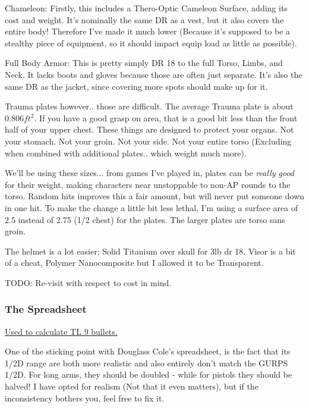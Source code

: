 \begin{multicols*}{2}
	Chameleon: Firstly, this includes a Thero-Optic Cameleon Surface, adding its cost and weight. It's nominally the same DR as a vest, but it also covers the entire body! Therefore I've made it much lower (Because it's supposed to be a stealthy piece of equipment, so it should impact equip load as little as possible).
	
	Full Body Armor: This is pretty simply DR 18 to the full Torso, Limbs, and Neck. It lacks boots and gloves because those are often just separate. It's also the same DR as the jacket, since covering more spots should make up for it.
	
	Trauma plates however.. those are difficult. The average Trauma plate is about \(0.806 ft^2\). If you have a good grasp on area, that is a good bit less than the front half of your upper chest. These things are designed to protect your organs. Not your stomach. Not your groin. Not your side. Not your entire torso (Excluding when combined with additional plates.. which weight much more).
	
	We'll be using these sizes... from games I've played in, plates can be \textit{really good} for their weight, making characters near unstoppable to non-AP rounds to the torso. Random hits improves this a fair amount, but will never put someone down in one hit. To make the change a little bit less lethal, I'm using a surface area of 2.5 instead of 2.75 (1/2 chest) for the plates. The larger plates are torso sans groin.
	
	The helmet is a lot easier; Solid Titanium over skull for 3lb dr 18. Visor is a bit of a cheat, Polymer Nanocomposite but I allowed it to be Transparent.
	
	TODO: Re-visit with respect to cost in mind.
	
	\subsubsection{The Spreadsheet}
	
	\textcolor{Blue}{\href{http://forums.sjgames.com/showpost.php?p=2124462&postcount=37}{Used to calculate TL 9 bullets.}}
	
	One of the sticking point with Douglass Cole's spreadsheet, is the fact that its 1/2D range are both more realistic and also entirely don't match the GURPS 1/2D. For long arms, they should be doubled - while for pistols they should be halved! I have opted for realism (Not that it even matters), but if the inconsistency bothers you, feel free to fix it.
	

\end{multicols*}
